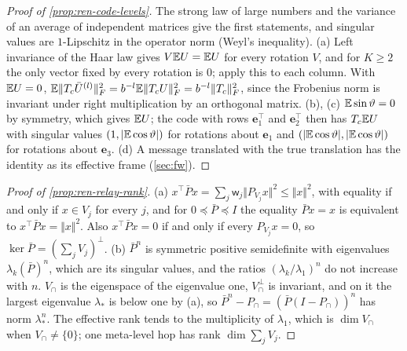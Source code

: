 \begin{proof}[Proof of \cref{prop:ren-code-levels}]
The strong law of large numbers and the variance of an average of independent matrices give the first statements, and singular values are $1$-Lipschitz in the operator norm (Weyl's inequality). (a) Left invariance of the Haar law gives $V\mathbb{E} U=\mathbb{E} U$ for every rotation $V$, and for $K\ge2$ the only vector fixed by every rotation is $0$; apply this to each column. With $\mathbb{E} U=0$, $\mathbb{E}\Vert T_c\bar U^{(l)}\Vert_F^2=b^{-l}\mathbb{E}\Vert T_cU\Vert_F^2=b^{-l}\Vert T_c\Vert_F^2$, since the Frobenius norm is invariant under right multiplication by an orthogonal matrix. (b), (c) $\mathbb{E}\sin\vartheta=0$ by symmetry, which gives $\mathbb{E} U$; the code with rows $\mathbf e_1^\top$ and $\mathbf e_2^\top$ then has $T_c\mathbb{E} U$ with singular values $(1,\lvert\mathbb{E}\cos\vartheta\rvert)$ for rotations about $\mathbf e_1$ and $(\lvert\mathbb{E}\cos\vartheta\rvert,\lvert\mathbb{E}\cos\vartheta\rvert)$ for rotations about $\mathbf e_3$. (d) A message translated with the true translation has the identity as its effective frame (\cref{sec:fw}).
\end{proof}

\begin{proof}[Proof of \cref{prop:ren-relay-rank}]
(a) $x^\top\bar Px=\sum_j\mathsf w_j\Vert P_{V_j}x\Vert^2\le\Vert x\Vert^2$, with equality if and only if $x\in V_j$ for every $j$, and for $0\preceq\bar P\preceq I$ the equality $\bar Px=x$ is equivalent to $x^\top\bar Px=\Vert x\Vert^2$. Also $x^\top\bar Px=0$ if and only if every $P_{V_j}x=0$, so $\ker\bar P=(\sum_jV_j)^\perp$. (b) $\bar P^n$ is symmetric positive semidefinite with eigenvalues $\lambda_k(\bar P)^n$, which are its singular values, and the ratios $(\lambda_k/\lambda_1)^n$ do not increase with $n$. $V_\cap$ is the eigenspace of the eigenvalue one, $V_\cap^\perp$ is invariant, and on it the largest eigenvalue $\lambda_\ast$ is below one by (a), so $\bar P^n-P_\cap=(\bar P(I-P_\cap))^n$ has norm $\lambda_\ast^n$. The effective rank tends to the multiplicity of $\lambda_1$, which is $\dim V_\cap$ when $V_\cap\neq\{0\}$; one meta-level hop has rank $\dim\sum_jV_j$.
\end{proof}

